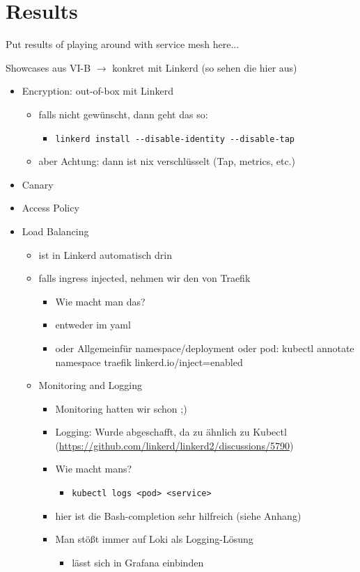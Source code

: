 \section{Results}

Put results of playing around with service mesh here...

Showcases aus VI-B $\rightarrow$ konkret mit Linkerd (so sehen die hier aus)
\begin{itemize}
	\item Encryption: out-of-box mit Linkerd 
	\begin{itemize}
	\item falls nicht gewünscht, dann geht das so:
	\begin{itemize}
	\item \lstinline|linkerd install --disable-identity --disable-tap|
	\end{itemize}
	\item aber Achtung: dann ist nix verschlüsselt (Tap, metrics, etc.)
	\end{itemize}
	\item Canary
	\item Access Policy
	\item Load Balancing
	\begin{itemize}
	\item ist in Linkerd automatisch drin
	\item falls ingress injected, nehmen wir den von Traefik
	\begin{itemize}
	\item Wie macht man das?
	\item entweder im yaml
	\item oder Allgemeinfür namespace/deployment oder pod: kubectl annotate namespace traefik linkerd.io/inject=enabled 
	\end{itemize}
	\item Monitoring and Logging
	\begin{itemize}
	\item Monitoring hatten wir schon ;)
	\item Logging: Wurde abgeschafft, da zu ähnlich zu Kubectl (\url{https://github.com/linkerd/linkerd2/discussions/5790})
	\item Wie macht mans?
	\begin{itemize}
	\item \lstinline|kubectl logs <pod> <service>|
	\end{itemize}
	\item hier ist die Bash-completion sehr hilfreich (siehe Anhang)
	\item Man stößt immer auf Loki als Logging-Lösung
	\begin{itemize}
	\item lässt sich in Grafana einbinden
	\end{itemize}
\end{itemize}
\end{itemize}
\end{itemize}
